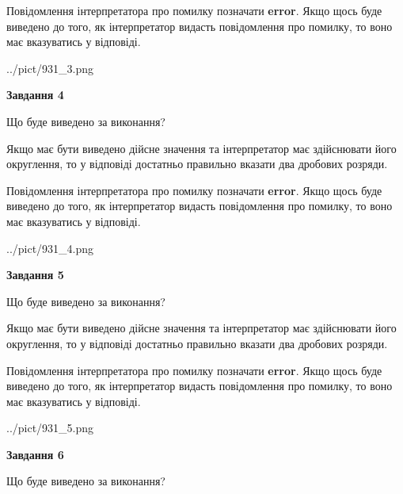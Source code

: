 \documentclass[12pt, ukrainian]{article}
\begin{document}
{\begin {Large}
Повідомлення інтерпретатора про помилку позначати \textbf{error}.
Якщо щось буде виведено до того, як інтерпретатор видасть повідомлення про помилку, 
то воно має вказуватись у відповіді. \par

\begin{center}
	{../pict/931_3.png}
\end{center}
\newpage

{\begin {center}\textbf{Завдання 4}\end {center}}\par
Що буде виведено за виконання? \par

Якщо має бути виведено дійсне значення та інтерпретатор має здійснювати його округлення, 
то у відповіді достатньо правильно вказати два дробових розряди.

Повідомлення інтерпретатора про помилку позначати \textbf{error}.
Якщо щось буде виведено до того, як інтерпретатор видасть повідомлення про помилку, 
то воно має вказуватись у відповіді. \par

\begin{center}
	{../pict/931_4.png}
\end{center}
\newpage

{\begin {center}\textbf{Завдання 5}\end {center}}\par
Що буде виведено за виконання? \par

Якщо має бути виведено дійсне значення та інтерпретатор має здійснювати його округлення, 
то у відповіді достатньо правильно вказати два дробових розряди.

Повідомлення інтерпретатора про помилку позначати \textbf{error}.
Якщо щось буде виведено до того, як інтерпретатор видасть повідомлення про помилку, 
то воно має вказуватись у відповіді. \par

\begin{center}
	{../pict/931_5.png}
\end{center}
\newpage

{\begin {center}\textbf{Завдання 6}\end {center}}\par
Що буде виведено за виконання? \par


\end{Large}}
\end{document}
